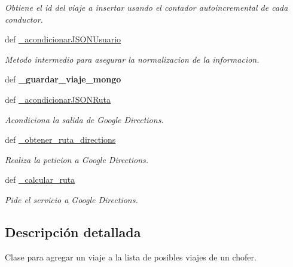 \begin{DoxyCompactItemize}
\begin{DoxyCompactList}\small\item\em Obtiene el id del viaje a insertar usando el contador autoincremental de cada conductor. \end{DoxyCompactList}\item 
def \hyperlink{classsrc_1_1resources_1_1agregar_posible_viaje_1_1_agregar_posible_viaje_a58a02362fca47d96278e36be3dd42ad7}{\-\_\-acondicionar\-J\-S\-O\-N\-Usuario}
\begin{DoxyCompactList}\small\item\em Metodo intermedio para asegurar la normalizacion de la informacion. \end{DoxyCompactList}\item 
\hypertarget{classsrc_1_1resources_1_1agregar_posible_viaje_1_1_agregar_posible_viaje_ad04b5932af3f4ae57f3a49c881c6530c}{def {\bfseries \-\_\-guardar\-\_\-viaje\-\_\-mongo}}\label{classsrc_1_1resources_1_1agregar_posible_viaje_1_1_agregar_posible_viaje_ad04b5932af3f4ae57f3a49c881c6530c}

\item 
def \hyperlink{classsrc_1_1resources_1_1agregar_posible_viaje_1_1_agregar_posible_viaje_a1526401fbb0f58fb43d607d2e686ef31}{\-\_\-acondicionar\-J\-S\-O\-N\-Ruta}
\begin{DoxyCompactList}\small\item\em Acondiciona la salida de Google Directions. \end{DoxyCompactList}\item 
def \hyperlink{classsrc_1_1resources_1_1agregar_posible_viaje_1_1_agregar_posible_viaje_a42f28fac7e1c6df7705f6d9298d19704}{\-\_\-obtener\-\_\-ruta\-\_\-directions}
\begin{DoxyCompactList}\small\item\em Realiza la peticion a Google Directions. \end{DoxyCompactList}\item 
def \hyperlink{classsrc_1_1resources_1_1agregar_posible_viaje_1_1_agregar_posible_viaje_ae4dbe06fe2e8c504ecc8d86275881aa3}{\-\_\-calcular\-\_\-ruta}
\begin{DoxyCompactList}\small\item\em Pide el servicio a Google Directions. \end{DoxyCompactList}\end{DoxyCompactItemize}


\subsection{Descripción detallada}
Clase para agregar un viaje a la lista de posibles viajes de un chofer. 



